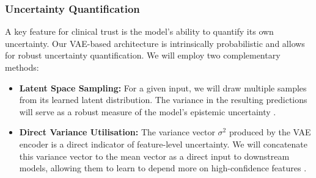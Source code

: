 \documentclass[11pt, a4paper]{article}
\begin{document}
\subsubsection{Uncertainty Quantification}
A key feature for clinical trust is the model's ability to quantify its own uncertainty. Our VAE-based architecture is intrinsically probabilistic and allows for robust uncertainty quantification. We will employ two complementary methods:
\begin{itemize}
    \item \textbf{Latent Space Sampling:} For a given input, we will draw multiple samples from its learned latent distribution. The variance in the resulting predictions will serve as a robust measure of the model's epistemic uncertainty \cite{BustinMeyer2025}.
    \item \textbf{Direct Variance Utilisation:} The variance vector $\sigma^2$ produced by the VAE encoder is a direct indicator of feature-level uncertainty. We will concatenate this variance vector to the mean vector as a direct input to downstream models, allowing them to learn to depend more on high-confidence features \cite{FriedrichFrisch2024}.
\end{itemize}
\end{document}
